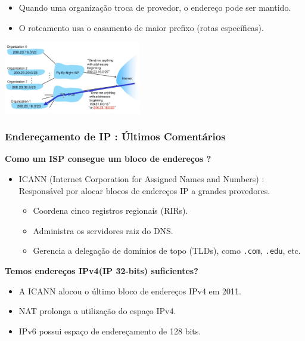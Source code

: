             \begin{itemize}[left=0.5cm, align=left, nosep]
                \item Quando uma organização troca de provedor, o endereço pode ser mantido.
                \item O roteamento usa o casamento de maior prefixo (rotas específicas).
            \end{itemize}

            \begin{center}
                \includegraphics[width=0.45\textwidth]{img/cap-04/endereco-hierarquico.png}
            \end{center}

        \subsubsection*{Endereçamento de IP : Últimos Comentários}
            \textbf{Como um ISP consegue um bloco de endereços ?}
            \begin{itemize}[left=0.5cm, align=left, nosep]
                \item ICANN (Internet Corporation for Assigned Names and Numbers) : Responsável por alocar blocos de endereços IP a grandes provedores.
                    \begin{itemize}[left=0.5cm, nosep, label=$\hookrightarrow$]
                        \item Coordena cinco registros regionais (RIRs).
                        \item Administra os servidores raiz do DNS.
                        \item Gerencia a delegação de domínios de topo (TLDs), como \texttt{.com}, \texttt{.edu}, etc.
                    \end{itemize}     
            \end{itemize}

            \textbf{Temos endereços IPv4(IP 32-bits) suficientes?}
            \begin{itemize}[left=0.5cm, align=left, nosep]
                \item A ICANN alocou o último bloco de endereços IPv4 em 2011.
                \item NAT prolonga a utilização do espaço IPv4.
                \item IPv6 possui espaço de endereçamento de 128 bits.
            \end{itemize}
    
